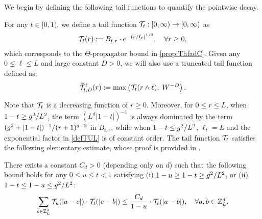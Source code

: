 We begin by defining the following tail functions to quantify the pointwise decay.

 
\begin{definition}\label{def: TTfunc}
For any $t\in [0,1)$, we define a tail function $\cal T_{t}:[0,\infty)\to [0,\infty)$ as
\begin{align}\label{defTUL}
  {\cal T}_{t}(r):=  B_{t,r}\cdot e^{- \left( 
  r/\ell_t \right) ^{1/2} },\quad \forall r\ge 0,
  \end{align}
which corresponds to the $\Theta$-propagator bound in \eqref{prop:ThfadC}. 
Given any $0\le \ell \le L$ and large constant $D>0$, we will also use a truncated tail function  defined as: 
\begin{align}\label{defWTTlD}
   \wT^{\ell}_{t,D}(r):= \max\left( {\cal T}_{t}(r\wedge \ell), \;  W^{-D}\right).
\end{align}
 \end{definition}

Note that ${\cal T}_{t}$ is a decreasing function of $r\ge 0$. Moreover, for $0\le r\le L$, when $1-t\ge \ilambda^2/L^{2}$, the term $(L^{d}|1-t|)^{-1}$ is always dominated by the term $(\ilambda^2+|1-t|)^{-1}/(r+1)^{d-2}$ in $B_{t,r}$, while when $1-t\le \ilambda^2/L^{2}$, $\ell_t=L$ and the exponential factor  in \eqref{defTUL} is of constant order.  
The tail function $\cT_t$ satisfies the following elementary estimate, whose proof is provided in . %

\begin{lemma}\label{lem:propT}
There exists a constant $C_d>0$ (depending only on $d$) such that the following bound holds 
for any $0\le u\le t<1$ satisfying (i) $1-u\ge 1- t\ge \ilambda^2/L^{2}$, or (ii) $1-t\le 1-u \le \ilambda^2/L^{2}$:
\begin{align}\label{TTT2}
 \sum_{c\in \Zn}{\cal T}_{u}(|a-c|)\cdot {\cal T}_{t}(| c -b |) \le \frac{C_d}{1-u}\cdot {\cal T}_{t}(|a-b|) ,\quad \forall a,b\in \Zn.
\end{align}
\end{lemma}



